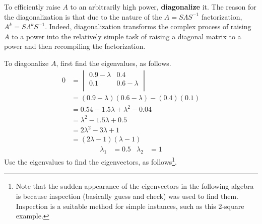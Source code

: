 \documentclass[titlepage]{article}
\begin{document}
To efficiently raise $A$ to an arbitrarily high power, \textbf{\gls{diagonalize}} it. The reason for the diagonalization is that due to the nature of the $A=S\Lambda S^{-1}$ factorization, $A^k=S\Lambda^kS^{-1}$. Indeed, diagonalization transforms the complex process of raising $A$ to a power into the relatively simple task of raising a diagonal matrix to a power and then recompiling the factorization.\par
To \gls{diagonalize} $A$, first find the eigenvalues, as follows.
\begin{align*}
    0 &=
    \begin{vmatrix}
        0.9-\lambda & 0.4\\
        0.1 & 0.6-\lambda\\
    \end{vmatrix}\\
    &= (0.9-\lambda)(0.6-\lambda)-(0.4)(0.1)\\
    &= 0.54-1.5\lambda+\lambda^2-0.04\\
    &= \lambda^2-1.5\lambda+0.5\\
    &= 2\lambda^2-3\lambda+1\\
    &= (2\lambda-1)(\lambda-1)
\end{align*}
\begin{align*}
    \lambda_1 &= 0.5&
        \lambda_2 &= 1
\end{align*}
Use the eigenvalues to find the eigenvectors, as follows\footnote{\label{fnt:inspection}Note that the sudden appearance of the eigenvectors in the following algebra is because inspection (basically guess and check) was used to find them. Inspection is a suitable method for simple instances, such as this 2-square example.}.
\end{document}
